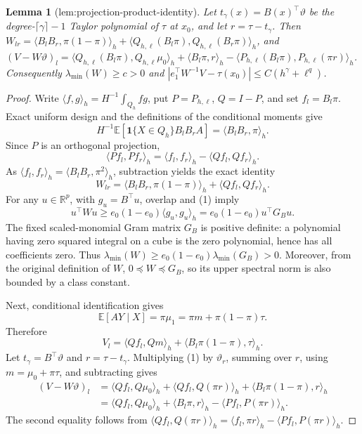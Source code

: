 \documentclass{article}
\newtheorem{lemma}{Lemma}
\begin{document}
\begin{lemma}[lem:projection-product-identity]\label{lem:projection-product-identity}
Let \(t_\gamma(x)=B(x)^\top\vartheta\) be the degree-\(\lceil\gamma\rceil-1\) Taylor polynomial of \(\tau\) at \(x_0\), and let \(r=\tau-t_\gamma\). Then \(W_{lr}=\langle B_lB_r,\pi(1-\pi)\rangle_h+\langle Q_{h,\ell}(B_l\pi),Q_{h,\ell}(B_r\pi)\rangle_h\), and \((V-W\vartheta)_l=\langle Q_{h,\ell}(B_l\pi),Q_{h,\ell}\mu_0\rangle_h+\langle B_l\pi,r\rangle_h-\langle P_{h,\ell}(B_l\pi),P_{h,\ell}(\pi r)\rangle_h\). Consequently \(\lambda_{\min}(W)\ge c>0\) and \(|e_1^\top W^{-1}V-\tau(x_0)|\le C(h^\gamma+\ell^q)\).
\end{lemma}
\begin{proof}
Write \(\langle f,g\rangle_h=H^{-1}\int_{Q_h}fg\), put \(P=P_{h,\ell}\), \(Q=I-P\), and set \(f_l=B_l\pi\).  Exact uniform design and the definitions of the conditional moments give
\[
 H^{-1}\mathbb E[\mathbf 1\{X\in Q_h\}B_lB_rA]
 =\langle B_lB_r,\pi\rangle_h.
\]
Since \(P\) is an orthogonal projection,
\[
 \langle Pf_l,Pf_r\rangle_h
 =\langle f_l,f_r\rangle_h-\langle Qf_l,Qf_r\rangle_h.
\]
As \(\langle f_l,f_r\rangle_h=\langle B_lB_r,\pi^2\rangle_h\), subtraction yields the exact identity
\[
 W_{lr}=\langle B_lB_r,\pi(1-\pi)\rangle_h
       +\langle Qf_l,Qf_r\rangle_h.                                      \tag{1}
\]
For any \(u\in\mathbb R^p\), with \(g_u=B^\top u\), overlap and (1) imply
\[
 u^\top Wu\ge e_0(1-e_0)\langle g_u,g_u\rangle_h
 =e_0(1-e_0)u^\top G_Bu.
\]
The fixed scaled-monomial Gram matrix \(G_B\) is positive definite: a polynomial having zero squared integral on a cube is the zero polynomial, hence has all coefficients zero.  Thus \(\lambda_{\min}(W)\ge e_0(1-e_0)\lambda_{\min}(G_B)>0\).  Moreover, from the original definition of \(W\),
\(0\preceq W\preceq G_B\), so its upper spectral norm is also bounded by a class constant.

Next, conditional identification gives
\[
 \mathbb E[AY\mid X]=\pi\mu_1=\pi m+\pi(1-\pi)\tau.
\]
Therefore
\[
 V_l=\langle Qf_l,Qm\rangle_h+\langle B_l\pi(1-\pi),\tau\rangle_h.       \tag{2}
\]
Let \(t_\gamma=B^\top\vartheta\) and \(r=\tau-t_\gamma\).  Multiplying (1) by \(\vartheta_r\), summing over \(r\), using \(m=\mu_0+\pi\tau\), and subtracting gives
\[
 \begin{aligned}
 (V-W\vartheta)_l
 &=\langle Qf_l,Q\mu_0\rangle_h
   +\langle Qf_l,Q(\pi r)\rangle_h
   +\langle B_l\pi(1-\pi),r\rangle_h\\
 &=\langle Qf_l,Q\mu_0\rangle_h
   +\langle B_l\pi,r\rangle_h
   -\langle Pf_l,P(\pi r)\rangle_h.                                    \tag{3}
 \end{aligned}
\]
The second equality follows from \(\langle Qf_l,Q(\pi r)\rangle_h=\langle f_l,\pi r\rangle_h-\langle Pf_l,P(\pi r)\rangle_h\).


\end{proof}
\end{document}
